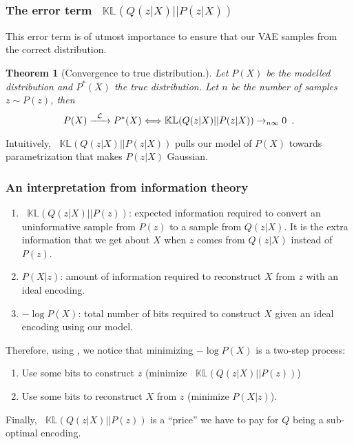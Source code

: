 \documentclass[12pt]{article}
\newtheorem{theorem}{Theorem}
\newcommand*\KL{\mathop{}\!\mathbb{KL}}
\newcommand*\iif{\mathop{}\!\Longleftrightarrow}
\begin{document}
\subsubsection{The error term $\KL(Q(z \vert X) \vert\vert P(z \vert X))$}

This error term is of utmost importance to ensure that our VAE samples from the correct distribution.
%
\begin{theorem}[Convergence to true distribution.]
    Let $P(X)$ be the modelled distribution and $P^*(X)$ the true distribution.
    Let $n$ be the number of samples $z \sim P(z)$, then 
    \begin{equation}
        P(X) \xrightarrow{\enskip \mathcal{L} \enskip} P^*(X) 
        \iif
        \KL(Q(z \vert X) \vert\vert P(z \vert X)) \rightarrow_{n\infty} 0
        \enspace .
    \end{equation}
\end{theorem}
%
Intuitively, $\KL(Q(z \vert X) \vert\vert P(z \vert X))$ pulls our model of $P(X)$ towards parametrization that makes $P(z\vert X)$ Gaussian.

\subsubsection{An interpretation from information theory}
%
\begin{enumerate}
    \item $\KL(Q(z \vert X) \vert\vert P(z))$: expected information required to convert an uninformative sample from $P(z)$ to a sample from $Q(z \vert X)$.
    It is the extra information that we get about $X$ when $z$ comes from $Q(z \vert X)$ instead of $P(z)$.

    \item $P(X \vert z)$: amount of information required to reconstruct $X$ from $z$ with an ideal encoding.
    
    \item $-\log P(X)$: total number of bits required to construct $X$ given an ideal encoding using our model.
\end{enumerate}
%
Therefore, using , we notice that minimizing $-\log P(X)$ is a two-step process:
%
\begin{enumerate}
    \item Use some bits to construct $z$ (minimize $\KL(Q(z \vert X) \vert\vert P(z))$)
    
    \item Use some bits to reconstruct $X$ from $z$ (minimize $P(X \vert z)$).
\end{enumerate}
%
Finally, $\KL(Q(z \vert X) \vert\vert P(z))$ is a ``price'' we have to pay for $Q$ being a sub-optimal encoding.
\end{document}
